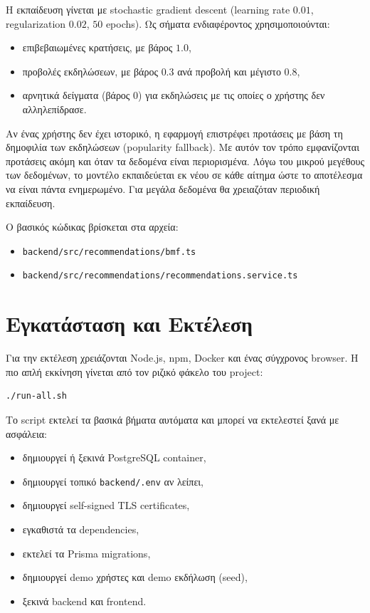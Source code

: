\documentclass[11pt,a4paper]{article}
\newcommand{\code}[1]{\texttt{#1}}
\begin{document}
Η εκπαίδευση γίνεται με stochastic gradient descent (learning rate $0.01$,
regularization $0.02$, $50$ epochs). Ως σήματα ενδιαφέροντος χρησιμοποιούνται:
\begin{itemize}
  \item επιβεβαιωμένες κρατήσεις, με βάρος $1.0$,
  \item προβολές εκδηλώσεων, με βάρος $0.3$ ανά προβολή και μέγιστο $0.8$,
  \item αρνητικά δείγματα (βάρος $0$) για εκδηλώσεις με τις οποίες ο χρήστης δεν
    αλληλεπίδρασε.
\end{itemize}

Αν ένας χρήστης δεν έχει ιστορικό, η εφαρμογή επιστρέφει προτάσεις με βάση τη
δημοφιλία των εκδηλώσεων (popularity fallback). Με αυτόν τον τρόπο εμφανίζονται
προτάσεις ακόμη και όταν τα δεδομένα είναι περιορισμένα. Λόγω του μικρού μεγέθους των
δεδομένων, το μοντέλο εκπαιδεύεται εκ νέου σε κάθε αίτημα ώστε το αποτέλεσμα να είναι
πάντα ενημερωμένο. Για μεγάλα δεδομένα θα χρειαζόταν περιοδική εκπαίδευση.

Ο βασικός κώδικας βρίσκεται στα αρχεία:
\begin{itemize}
  \item \code{backend/src/recommendations/bmf.ts}
  \item \code{backend/src/recommendations/recommendations.service.ts}
\end{itemize}

\section{Εγκατάσταση και Εκτέλεση}

Για την εκτέλεση χρειάζονται Node.js, npm, Docker και ένας σύγχρονος browser. Η πιο
απλή εκκίνηση γίνεται από τον ριζικό φάκελο του project:
\begin{Verbatim}
./run-all.sh
\end{Verbatim}

Το script εκτελεί τα βασικά βήματα αυτόματα και μπορεί να εκτελεστεί ξανά με ασφάλεια:
\begin{itemize}
  \item δημιουργεί ή ξεκινά PostgreSQL container,
  \item δημιουργεί τοπικό \code{backend/.env} αν λείπει,
  \item δημιουργεί self-signed TLS certificates,
  \item εγκαθιστά τα dependencies,
  \item εκτελεί τα Prisma migrations,
  \item δημιουργεί demo χρήστες και demo εκδήλωση (seed),
  \item ξεκινά backend και frontend.
\end{itemize}
\end{document}
